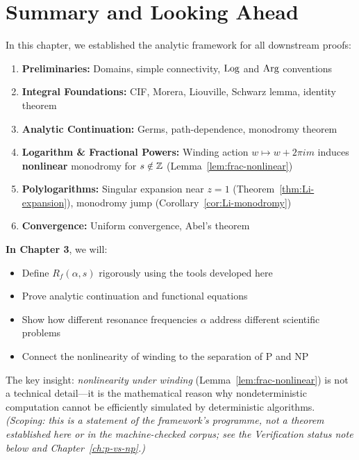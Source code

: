 \section{Summary and Looking Ahead}

In this chapter, we established the analytic framework for all downstream proofs:

\begin{enumerate}
\item \textbf{Preliminaries:} Domains, simple connectivity, $\operatorname{Log}$ and $\operatorname{Arg}$ conventions
\item \textbf{Integral Foundations:} CIF, Morera, Liouville, Schwarz lemma, identity theorem
\item \textbf{Analytic Continuation:} Germs, path-dependence, monodromy theorem
\item \textbf{Logarithm \& Fractional Powers:} Winding action $w \mapsto w + 2\pi i m$ induces \textbf{nonlinear} monodromy for $s \notin \mathbb{Z}$ (Lemma~\ref{lem:frac-nonlinear})
\item \textbf{Polylogarithms:} Singular expansion near $z = 1$ (Theorem~\ref{thm:Li-expansion}), monodromy jump (Corollary~\ref{cor:Li-monodromy})
\item \textbf{Convergence:} Uniform convergence, Abel's theorem
\end{enumerate}

\textbf{In Chapter 3}, we will:
\begin{itemize}
\item Define $R_f(\alpha, s)$ rigorously using the tools developed here
\item Prove analytic continuation and functional equations
\item Show how different resonance frequencies $\alpha$ address different scientific problems
\item Connect the nonlinearity of winding to the separation of P and NP
\end{itemize}

The key insight: \textit{nonlinearity under winding} (Lemma~\ref{lem:frac-nonlinear}) is not a technical detail—it is the mathematical reason why nondeterministic computation cannot be efficiently simulated by deterministic algorithms. \emph{(Scoping: this is a statement of the framework's programme, not a theorem established here or in the machine-checked corpus; see the Verification status note below and Chapter~\ref{ch:p-vs-np}.)}

